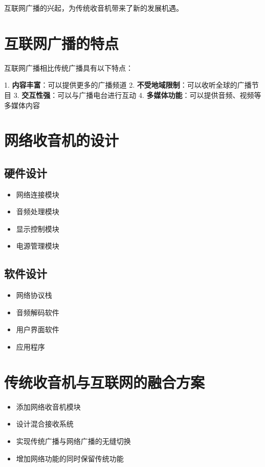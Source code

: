 \documentclass[12pt,UTF8]{ctexbook}
\begin{document}
互联网广播的兴起，为传统收音机带来了新的发展机遇。

\section{互联网广播的特点}

互联网广播相比传统广播具有以下特点：

1. \textbf{内容丰富}：可以提供更多的广播频道
2. \textbf{不受地域限制}：可以收听全球的广播节目
3. \textbf{交互性强}：可以与广播电台进行互动
4. \textbf{多媒体功能}：可以提供音频、视频等多媒体内容

\section{网络收音机的设计}

\subsection{硬件设计}\begin{itemize}
  \item 网络连接模块
  \item 音频处理模块
  \item 显示控制模块
  \item 电源管理模块\end{itemize}

\subsection{软件设计}\begin{itemize}
  \item 网络协议栈
  \item 音频解码软件
  \item 用户界面软件
  \item 应用程序\end{itemize}

\section{传统收音机与互联网的融合方案}\begin{itemize}
  \item 添加网络收音机模块
  \item 设计混合接收系统
  \item 实现传统广播与网络广播的无缝切换
  \item 增加网络功能的同时保留传统功能\end{itemize}
\end{document}
